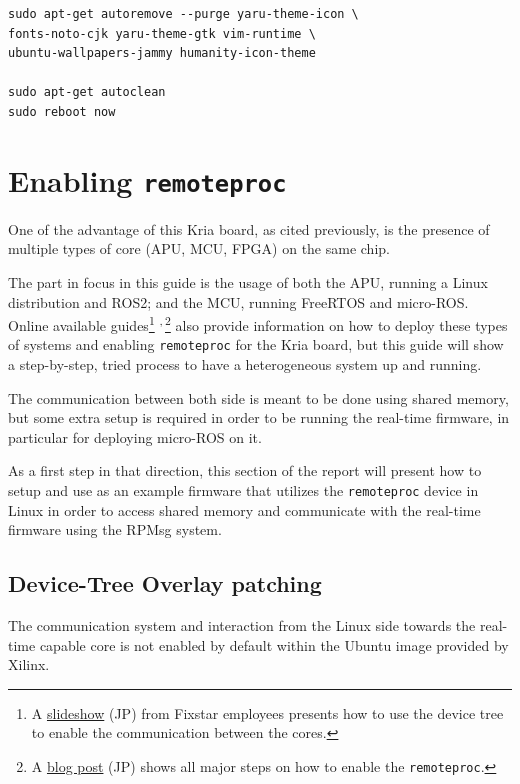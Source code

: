 \documentclass[10pt]{article}
\begin{document}
\begin{verbatim}
sudo apt-get autoremove --purge yaru-theme-icon \
fonts-noto-cjk yaru-theme-gtk vim-runtime \
ubuntu-wallpapers-jammy humanity-icon-theme

sudo apt-get autoclean
sudo reboot now
\end{verbatim}

\section{Enabling \texttt{remoteproc}}
\label{sec:orgc220b2b}
One of the advantage of this Kria board, as cited previously, is the presence of
multiple types of core (APU, MCU, FPGA) on the same chip.

The part in focus in this guide is the usage of both the APU, running
a Linux distribution and ROS2; and the MCU, running FreeRTOS and micro-ROS.
Online available guides\footnote{A \href{https://speakerdeck.com/fixstars/fpga-seminar-12-fixstars-corporation-20220727}{slideshow} (JP) from Fixstar employees presents how to use the device
tree to enable the communication between the cores.} \textsuperscript{,}\,\footnote{A \href{https://zenn.dev/ryuz88/articles/kv260\_setup\_memo\_ubuntu22 }{blog post} (JP) shows all major steps on how to enable the \texttt{remoteproc}.} also provide information on how to deploy these types
of systems and enabling \texttt{remoteproc} for the Kria board, but this guide
will show a step-by-step, tried process to have a heterogeneous system
up and running.

The communication between both side is meant to be done using shared memory, but
some extra setup is required in order to be running the real-time firmware, in particular
for deploying micro-ROS on it.

As a first step in that direction, this section of the report
will present how to setup and use as an example firmware that utilizes the
\texttt{remoteproc} device in Linux in order to access shared memory
and communicate with the real-time firmware using the RPMsg system.

\subsection{Device-Tree Overlay patching}
\label{sec:org920154d}
The communication system and interaction from the Linux side towards the real-time capable core
is not enabled by default within the Ubuntu image provided by Xilinx.
\end{document}
